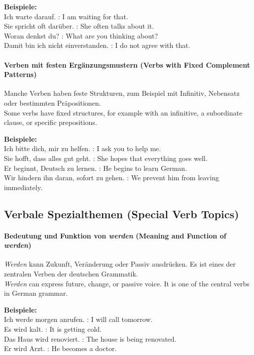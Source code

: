 \documentclass[a4paper]{article}
\begin{document}
        \textbf{Beispiele:}\\
        Ich warte darauf. : I am waiting for that.\\
        Sie spricht oft darüber. : She often talks about it.\\
        Woran denkst du? : What are you thinking about?\\
        Damit bin ich nicht einverstanden. : I do not agree with that.
    
    \paragraph{Verben mit festen Ergänzungsmustern {\small (Verbs with Fixed Complement Patterns)}}
        Manche Verben haben feste Strukturen, zum Beispiel mit Infinitiv, Nebensatz oder bestimmten Präpositionen.\\
        Some verbs have fixed structures, for example with an infinitive, a subordinate clause, or specific prepositions.
        
        \textbf{Beispiele:}\\
        Ich bitte dich, mir zu helfen. : I ask you to help me.\\
        Sie hofft, dass alles gut geht. : She hopes that everything goes well.\\
        Er beginnt, Deutsch zu lernen. : He begins to learn German.\\
        Wir hindern ihn daran, sofort zu gehen. : We prevent him from leaving immediately.
    
    \subsection{Verbale Spezialthemen {\small (Special Verb Topics)}}
    
    \paragraph{Bedeutung und Funktion von \textit{werden} {\small (Meaning and Function of \textit{werden})}}
        \textit{Werden} kann Zukunft, Veränderung oder Passiv ausdrücken. Es ist eines der zentralen Verben der deutschen Grammatik.\\
        \textit{Werden} can express future, change, or passive voice. It is one of the central verbs in German grammar.
        
        \textbf{Beispiele:}\\
        Ich werde morgen anrufen. : I will call tomorrow.\\
        Es wird kalt. : It is getting cold.\\
        Das Haus wird renoviert. : The house is being renovated.\\
        Er wird Arzt. : He becomes a doctor.
    
\end{document}
